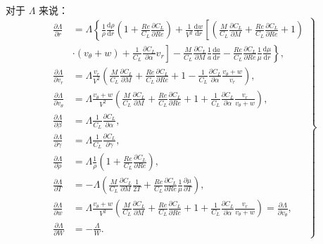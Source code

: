 对于 $\Lambda$ 来说：
\begin{equation}\label{eq:ch13_lambda_deriv}
\left.
\begin{aligned}
\frac{\partial \Lambda}{\partial r} &= \Lambda \left\{ \frac{1}{\rho} \frac{\mathrm{d}\rho}{\mathrm{d}r} \left( 1 + \frac{Re}{C_L} \frac{\partial C_L}{\partial Re} \right) + \frac{1}{V^2} \frac{\mathrm{d}w}{\mathrm{d}r} \left[ \left( \frac{M}{C_L} \frac{\partial C_L}{\partial M} + \frac{Re}{C_L} \frac{\partial C_L}{\partial Re} + 1 \right)\right.\right. \\
&\left.\left. \cdot (v_\theta + w) + \frac{1}{C_L} \frac{\partial C_L}{\partial \alpha} v_r \right] - \frac{M}{C_L} \frac{\partial C_L}{\partial M} \frac{1}{a} \frac{\mathrm{d}a}{\mathrm{d}r} - \frac{Re}{C_L} \frac{\partial C_L}{\partial Re} \frac{1}{\mu} \frac{\mathrm{d}\mu}{\mathrm{d}r} \right\}, \\
\frac{\partial \Lambda}{\partial v_r} &= \Lambda \frac{v_r}{V^2} \left( \frac{M}{C_L} \frac{\partial C_L}{\partial M} + \frac{Re}{C_L} \frac{\partial C_L}{\partial Re} + 1 - \frac{1}{C_L} \frac{\partial C_L}{\partial \alpha} \frac{v_\theta + w}{v_r} \right), \\
\frac{\partial \Lambda}{\partial v_\theta} &= \Lambda \frac{v_\theta + w}{V^2} \left( \frac{M}{C_L} \frac{\partial C_L}{\partial M} + \frac{Re}{C_L} \frac{\partial C_L}{\partial Re} + 1 + \frac{1}{C_L} \frac{\partial C_L}{\partial \alpha} \frac{v_r}{v_\theta + w} \right), \\
\frac{\partial \Lambda}{\partial \beta} &= \Lambda \frac{1}{C_L} \frac{\partial C_L}{\partial \alpha}, \\
\frac{\partial \Lambda}{\partial \gamma} &= \Lambda \frac{1}{C_L} \frac{\partial C_L}{\partial \gamma}, \\
\frac{\partial \Lambda}{\partial \rho} &= \Lambda \frac{1}{\rho} \left( 1 + \frac{Re}{C_L} \frac{\partial C_L}{\partial Re} \right), \\
\frac{\partial \Lambda}{\partial T} &= -\Lambda \left( \frac{M}{C_L} \frac{\partial C_L}{\partial M} \frac{1}{2T} + \frac{Re}{C_L} \frac{\partial C_L}{\partial Re} \frac{1}{\mu} \frac{\partial \mu}{\partial T} \right), \\
\frac{\partial \Lambda}{\partial w} &= \Lambda \frac{v_\theta + w}{V^2} \left( \frac{M}{C_L} \frac{\partial C_L}{\partial M} + \frac{Re}{C_L} \frac{\partial C_L}{\partial Re} + 1 + \frac{1}{C_L} \frac{\partial C_L}{\partial \alpha} \frac{v_r}{v_\theta + w} \right) = \frac{\partial \Lambda}{\partial v_\theta}, \\
\frac{\partial \Lambda}{\partial W} &= -\frac{\Lambda}{W}.
\end{aligned}
\right\}
\end{equation}

